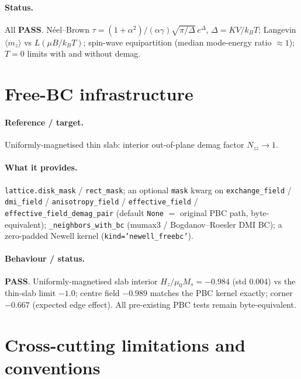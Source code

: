 \documentclass[11pt]{article}
\newcommand{\PASS}{\textcolor{green!55!black}{\textbf{PASS}}}
\begin{document}
\paragraph{Status.} All \PASS. N\'eel--Brown
$\tau=(1+\alpha^2)/(\alpha\gamma)\sqrt{\pi/\Delta}\,e^{\Delta}$,
$\Delta=K V/k_BT$; Langevin $\langle m_z\rangle$ vs $L(\mu B/k_BT)$;
spin-wave equipartition (median mode-energy ratio ${\approx}1$);
$T{=}0$ limits with and without demag.

\clearpage
\section{Free-BC infrastructure}
\label{sec:freebc}

\paragraph{Reference / target.} Uniformly-magnetised thin slab:
interior out-of-plane demag factor $N_{zz}\to1$.

\paragraph{What it provides.} \texttt{lattice.disk\_mask} /
\texttt{rect\_mask}; an optional \texttt{mask} kwarg on
\texttt{exchange\_field} / \texttt{dmi\_field} /
\texttt{anisotropy\_field} / \texttt{effective\_field} /
\texttt{effective\_field\_demag\_pair} (default \texttt{None} $=$
original PBC path, byte-equivalent); \texttt{\_neighbors\_with\_bc}
(mumax3 / Bogdanov--Roesler DMI BC); a zero-padded Newell kernel
(\texttt{kind='newell\_freebc'}).

\paragraph{Behaviour / status.} \PASS. Uniformly-magnetised slab
interior $H_z/\mu_0 M_s=-0.984$ (std 0.004) vs the thin-slab limit
$-1.0$; centre field $-0.989$ matches the PBC kernel exactly;
corner $-0.667$ (expected edge effect). All pre-existing PBC tests
remain byte-equivalent.

\clearpage
\section{Cross-cutting limitations and conventions}
\end{document}
